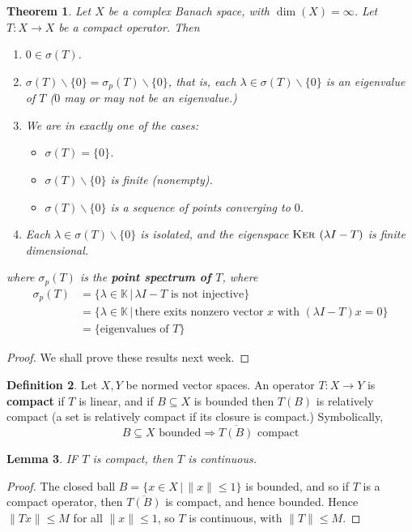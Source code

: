\documentclass[10pt, oneside, reqno]{amsart}
\theoremstyle{plain}%
\newtheorem{thm}{Theorem}[section]
\newtheorem{lem}[thm]{Lemma}
\theoremstyle{definition}
\newtheorem{defn}[thm]{Definition}
\theoremstyle{remark}
\newcommand{\given}{ \, | \,}
\newcommand{\K}{\mathbb{K}}
\renewcommand{\ker}{\textsc{Ker\ }}
\begin{document}
\begin{thm}
	Let $X$ be a complex Banach space, with $\dim(X) = \infty$.  Let $T : X \rightarrow X$ be a compact operator.  Then \begin{enumerate}[(1)]
		\item $0 \in \sigma(T)$.  
		\item $\sigma(T) \backslash \{ 0 \} = \sigma_p(T) \backslash \{ 0 \}$, that is, each $\lambda \in \sigma(T) \backslash \{ 0 \}$ is an eigenvalue of $T$ ($0$ may or may not be an eigenvalue.)
		\item We are in exactly one of the cases:
		 \begin{itemize}
		 	\item $\sigma(T) = \{ 0 \}$.
		 	\item $\sigma(T) \backslash \{ 0 \}$ is finite (nonempty).
		 	\item $\sigma(T) \backslash \{ 0 \}$ is a sequence of points converging to $0$.  
		 \end{itemize}
		 \item Each $\lambda \in \sigma(T) \backslash \{ 0 \}$ is isolated, and the eigenspace $\ker(\lambda I - T)$ is finite dimensional.  
	\end{enumerate}  
	where $\sigma_p(T)$ is the \textbf{point spectrum of $T$}, where \begin{align*}
		\sigma_p(T) &= \{ \lambda \in \K \given \text{$\lambda I - T$ is not injective}\} \\
		 			&= \{ \lambda \in \K \given \text{there exits nonzero vector $x$ with $(\lambda I - T)x = 0$}\} \\
					&= \{ \text{eigenvalues of $T$} \}
	\end{align*}
	
\end{thm}
\begin{proof}
	We shall prove these results next week.
\end{proof}

\begin{defn}
	Let $X, Y$ be normed vector spaces.  An operator $T : X \rightarrow Y$ is \textbf{compact} if $T$ is linear, and if $B \subseteq X$ is bounded then $T(B) $ is relatively compact (a set is relatively compact if its closure is compact.)  Symbolically, \[
		\text{$B\subseteq X$ bounded} \Rightarrow \text{$\overline{T(B)}$ compact}
	\]
\end{defn}

\begin{lem}
	IF $T$ is compact, then $T$ is continuous.
\end{lem}
\begin{proof}
	The closed ball $B  = \{ x \in X \given \| x \| \leq 1 \}$ is bounded, and so if $T$ is a compact operator, then $\overline{T(B)}$ is compact, and hence bounded.  Hence $\| Tx \| \leq M$ for all $\| x \| \leq 1$, so $T$ is continuous, with $\| T \| \leq M$.  
\end{proof}
\end{document}
